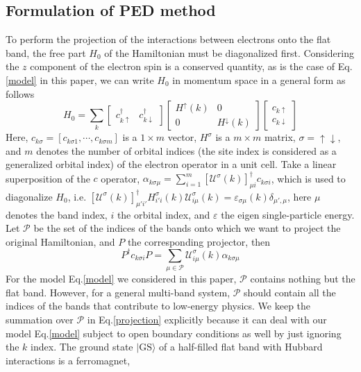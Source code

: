 \documentclass[amsmath,superscriptaddress,showpacs,aps,prb,twocolumn]{revtex4-1}
\begin{document}
\subsection{Formulation of PED method}
\par To perform the projection of the interactions between electrons onto the flat band, the free part $H_0$ of the Hamiltonian must be diagonalized first. Considering the $z$ component of the electron spin is a conserved quantity, as is the case of Eq.\ref{model} in this paper, we can write $H_0$ in momentum space in a general form as follows
\begin{equation}\label{H0}
H_0=\sum_k
\begin{bmatrix}
    c^\dagger_{k\uparrow} & c^\dagger_{k\downarrow}
\end{bmatrix}
\begin{bmatrix}
    H^{\uparrow}(k) & 0 \\
    0 & H^{\downarrow}(k)
\end{bmatrix}
\begin{bmatrix}
    c_{k\uparrow} \\
    c_{k\downarrow}
\end{bmatrix}
\end{equation}
Here, $c_{k\sigma}=\left[c_{k\sigma 1},\cdots,c_{k\sigma m}\right]$ is a $1\times m$ vector, $H^{\sigma}$ is a $m\times m$ matrix, $\sigma=\uparrow\downarrow$, and $m$ denotes the number of orbital indices (the site index is considered as a generalized orbital index) of the electron operator in a unit cell. Take a linear superposition of the $c$ operator, $\alpha_{k\sigma\mu}=\sum_{i=1}^m\left[\mathcal{U}^\sigma(k)\right]_{\mu i}^\dagger c_{k\sigma i}$, which is used to diagonalize $H_0$, i.e. $\left[\mathcal{U}^\sigma(k)\right]^\dagger_{\mu'i'}H^\sigma_{i'i}(k)\mathcal{U}^\sigma_{i\mu}(k)=\varepsilon_{\sigma\mu}(k)\delta_{\mu',\mu}$, here $\mu$ denotes the band index, $i$ the orbital index, and $\varepsilon$ the eigen single-particle energy. Let $\mathcal{P}$ be the set of the indices of the bands onto which we want to project the original Hamiltonian, and $P$ the corresponding projector, then
\begin{equation}\label{projection}
  P^\dagger c_{k\sigma i}P=\sum_{\mu\in\mathcal{P}}\mathcal{U}^\sigma_{i\mu}(k)\alpha_{k\sigma\mu}
\end{equation}
For the model Eq.\ref{model} we considered in this paper, $\mathcal{P}$ contains nothing but the flat band. However, for a general multi-band system, $\mathcal{P}$ should contain all the indices of the bands that contribute to low-energy physics. We keep the summation over $\mathcal{P}$ in Eq.\ref{projection} explicitly because it can deal with our model Eq.\ref{model} subject to open boundary conditions as well by just ignoring the $k$ index. The ground state $|\text{GS}\rangle$ of a half-filled flat band with Hubbard interactions is a ferromagnet,
\end{document}
